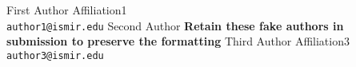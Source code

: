 \threeauthors
{First Author}
{Affiliation1 \\ {\tt author1@ismir.edu}}
{Second Author}
{\bf Retain these fake authors in\\\bf submission to preserve the formatting}
{Third Author}
{Affiliation3 \\ {\tt author3@ismir.edu}}
